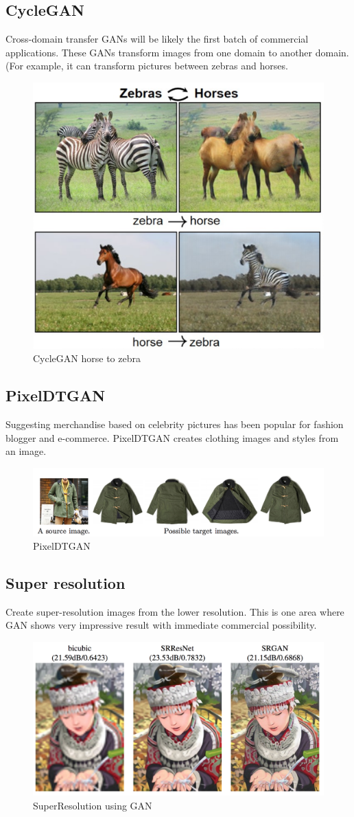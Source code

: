 \begin{onehalfspace}
    \subsection{CycleGAN}
    Cross-domain transfer GANs will be likely the first batch of commercial applications. These GANs transform images from one domain to another domain.
    (For example, it can transform pictures between zebras and horses.
    \begin{figure}[h]
        \centering
        \includegraphics[width=0.5\linewidth]{zebratohorse.png}
        \caption{CycleGAN horse to zebra}
    \end{figure} 
    
    \subsection{PixelDTGAN}
    Suggesting merchandise based on celebrity pictures has been popular for fashion blogger and e-commerce. PixelDTGAN creates clothing images and styles from an image.
    \begin{figure}[h]
        \centering
        \includegraphics[width=0.5\linewidth]{pixeldtgan.png}
        \caption{PixelDTGAN}
    \end{figure} 
    
    \subsection{Super resolution}
    Create super-resolution images from the lower resolution. This is one area where GAN shows very impressive result with immediate commercial possibility.
    \begin{figure}[h]
        \centering
        \includegraphics[width=0.5\linewidth]{superresolution.png}
        \caption{SuperResolution using GAN}
    \end{figure} 


\end{onehalfspace}

